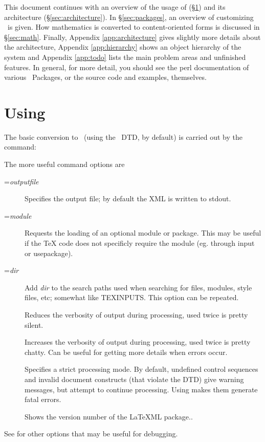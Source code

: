 \documentclass{article}
\begin{document}
\medskip
This document continues with an overview of the usage of \LaTeXML (\S\ref{sec:usage})
and its architecture (\S\ref{sec:architecture}).   
In \S\ref{sec:packages}, an overview of customizing \LaTeXML\ is given.
How mathematics is converted to content-oriented forms is discussed in \S\ref{sec:math}.
Finally, Appendix \ref{app:architecture} gives slightly more details about the architecture,
Appendix \ref{app:hierarchy} shows an object hierarchy of the system
and Appendix \ref{app:todo} lists the main problem areas and unfinished features.
In general, for more detail, you should see the perl documentation of various
\LaTeXML\ Packages, or the source code and examples, themselves.

\section{Using \LaTeXML}\label{sec:usage}
The basic conversion to \XML\ (using the \LaTeXML\ DTD, by default) is carried out
by the command:
\begin{quote}
\end{quote}
The more useful command options are
\begin{description}
\item[=\textit{outputfile}]
Specifies the output file; by default the XML is written to stdout.

\item[=\textit{module}]
Requests the loading of an optional module or package.  This may be useful if the TeX code
does not specificly require the module (eg. through input or usepackage).

\item[=\textit{dir}]
Add \textit{dir} to the search paths used when searching for files, modules, style files, etc;
somewhat like TEXINPUTS.  This option can be repeated.

\item[]
Reduces the verbosity of output during processing, used twice is pretty silent.

\item[]
Increases the verbosity of output during processing, used twice is pretty chatty.
Can be useful for getting more details when errors occur.

\item[]
Specifies a strict processing mode. By default, undefined control sequences and
invalid document constructs (that violate the DTD) give warning messages, but attempt
to continue processing.  Using  makes them generate fatal errors.

\item[]
Shows the version number of the LaTeXML package..
\end{description}
See  for other options that may be useful for debugging.
\end{document}
